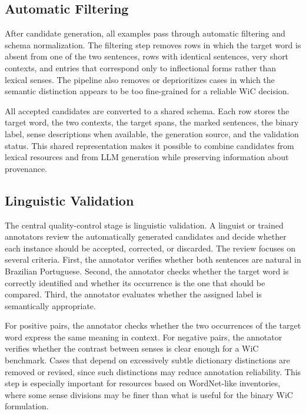 \documentclass[10pt,a4paper,twocolumn]{article}
\begin{document}
\subsection{Automatic Filtering}
\label{subsec:filtering-normalization}

After candidate generation, all examples pass through automatic filtering and schema normalization. The filtering step removes rows in which the target word is absent from one of the two sentences, rows with identical sentences, very short contexts, and entries that correspond only to inflectional forms rather than lexical senses. The pipeline also removes or deprioritizes cases in which the semantic distinction appears to be too fine-grained for a reliable WiC decision.

All accepted candidates are converted to a shared schema. Each row stores the target word, the two contexts, the target spans, the marked sentences, the binary label, sense descriptions when available, the generation source, and the validation status. This shared representation makes it possible to combine candidates from lexical resources and from LLM generation while preserving information about provenance.

\subsection{Linguistic Validation}
\label{subsec:linguistic-validation}

The central quality-control stage is linguistic validation. A linguist or trained annotators review the automatically generated candidates and decide whether each instance should be accepted, corrected, or discarded. The review focuses on several criteria. First, the annotator verifies whether both sentences are natural in Brazilian Portuguese. Second, the annotator checks whether the target word is correctly identified and whether its occurrence is the one that should be compared. Third, the annotator evaluates whether the assigned label is semantically appropriate.

For positive pairs, the annotator checks whether the two occurrences of the target word express the same meaning in context. For negative pairs, the annotator verifies whether the contrast between senses is clear enough for a WiC benchmark. Cases that depend on excessively subtle dictionary distinctions are removed or revised, since such distinctions may reduce annotation reliability. This step is especially important for resources based on WordNet-like inventories, where some sense divisions may be finer than what is useful for the binary WiC formulation.
\end{document}
